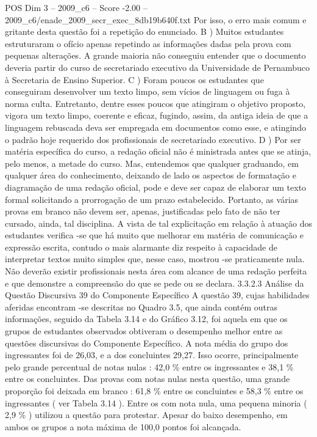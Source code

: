 \begin{textsample}{POS Dim 3 – 2009\_c6 – Score -2.00 – 2009\_c6/enade\_2009\_secr\_exec\_8db19b640f.txt}
Por isso, o erro mais comum e gritante desta questão foi a repetição do enunciado.
B ) Muitos estudantes estruturaram o ofício apenas repetindo as informações dadas pela prova com pequenas alterações.
A grande maioria não conseguiu entender que o documento deveria partir do curso de secretariado executivo da Universidade de Pernambuco à Secretaria de Ensino Superior.
C ) Foram poucos os estudantes que conseguiram desenvolver um texto limpo, sem vícios de linguagem ou fuga à norma culta.
Entretanto, dentre esses poucos que atingiram o objetivo proposto, vigora um texto limpo, coerente e eficaz, fugindo, assim, da antiga ideia de que a linguagem rebuscada deva ser empregada em documentos como esse, e atingindo o padrão hoje requerido dos profissionais de secretariado executivo.
D ) Por ser matéria específica do curso, a redação oficial não é ministrada antes que se atinja, pelo menos, a metade do curso.
Mas, entendemos que qualquer graduando, em qualquer área do conhecimento, deixando de lado os aspectos de formatação e diagramação de uma redação oficial, pode e deve ser capaz de elaborar um texto formal solicitando a prorrogação de um prazo estabelecido.
Portanto, as várias provas em branco não devem ser, apenas, justificadas pelo fato de não ter cursado, ainda, tal disciplina.
A vista de tal explicitação em relação à atuação dos estudantes verifica -se que há muito que melhorar em matéria de comunicação e expressão escrita, contudo o mais alarmante diz respeito à capacidade de interpretar textos muito simples que, nesse caso, mostrou -se praticamente nula.
Não deverão existir profissionais nesta área com alcance de uma redação perfeita e que demonstre a compreensão do que se pede ou se declara. 3.3.2.3 Análise da Questão Discursiva 39 do Componente Específico A questão 39, cujas habilidades aferidas encontram -se descritas no Quadro 3.5, que ainda contém outras informações, seguido da Tabela 3.14 e do Gráfico 3.12, foi aquela em que os grupos de estudantes observados obtiveram o desempenho melhor entre as questões discursivas do Componente Específico.
A nota média do grupo dos ingressantes foi de 26,03, e a dos concluintes 29,27.
Isso ocorre, principalmente pelo grande percentual de notas nulas : 42,0 \% entre os ingressantes e 38,1 \% entre os concluintes.
Das provas com notas nulas nesta questão, uma grande proporção foi deixada em branco : 61,8 \% entre os concluintes e 58,3 \% entre os ingressantes ( ver Tabela 3.14 ).
Entre os com nota nula, uma pequena minoria ( 2,9 \% ) utilizou a questão para protestar.
Apesar do baixo desempenho, em ambos os grupos a nota máxima de 100,0 pontos foi alcançada.

\end{textsample}
